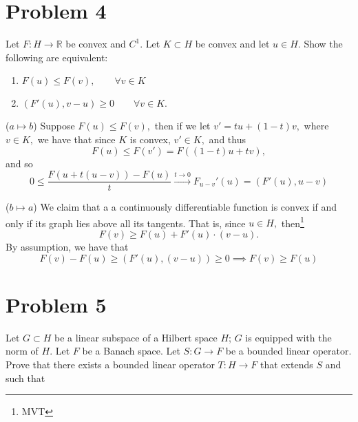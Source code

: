 \documentclass[11pt]{article}
\newcommand{\bbR}{\mathbb{R}}
\begin{document}
\begin{problem}
\begin{enumerate}
\begin{solution}
   \end{solution}
\end{enumerate}

\newpage
\section*{Problem 4}
    \begin{problem}
        Let $F: H \to \bbR$ be convex and $C^1.$ Let $K\subset H$ be convex and let $u\in H.$ Show the following are equivalent:
        \begin{enumerate}[label=(\roman*)]
            \item $F(u) \leq F(v), \qquad \forall v\in K$
            \item $(F'(u), v-u) \geq 0 \qquad \forall v\in K.$
        \end{enumerate}
    \end{problem}
    \begin{solution}
        ($a \mapsto b$) Suppose $F(u)\leq F(v),$ then if we let $v' = tu + (1-t)v,$ where $v \in K,$ we have that since $K$ is convex, $v' \in K,$ and thus
        \[F(u)\leq F(v') = F((1-t)u + tv),\] and so 
        \[0 \leq \frac{F(u + t(u-v)) - F(u)}{t} \xrightarrow[]{t\to 0} F_{u-v}'(u) = (F'(u), u-v)\]

        ($b\mapsto a$) We claim that a a continuously differentiable function is convex if and only if its graph lies above all its tangents. That is, since $u\in H,$ then\footnote{MVT} 
        \[F(v) \geq F(u) + F'(u)\cdot(v-u).\] By assumption, we have that 
        \[F(v)- F(u) \geq (F'(u), (v-u)) \geq 0 \implies F(v) \geq F(u)\]
    \end{solution}

\newpage
\section*{Problem 5}
\begin{problem}
    Let \( G \subset H \) be a linear subspace of a Hilbert space \( H \); \( G \) is equipped with the norm of \( H \). Let \( F \) be a Banach space. Let \( S : G \to F \) be a bounded linear operator. Prove that there exists a bounded linear operator \( T : H \to F \) that extends \( S \) and such that



\end{problem}
\end{problem}
\end{document}
